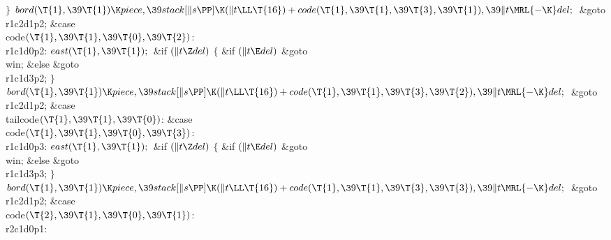 \2${}\}{}$\2\6
${}\\{bord}(\T{1},\39\T{1})\K\\{piece},\39\\{stack}[\|s\PP]\K(\|t\LL\T{16})+%
\\{code}(\T{1},\39\T{1},\39\T{3},\39\T{1}),\39\|t\MRL{-{\K}}\\{del};{}$\6
\&{goto} \\{r1c2d1p2};\6
\4\&{case} \\{code}${}(\T{1},\39\T{1},\39\T{0},\39\T{2}){}$:\5
\\{r1c1d0p2}:\5
${}\\{east}(\T{1},\39\T{1});{}$\6
\&{if} ${}(\|t\Z\\{del}){}$\5
${}\{{}$\5
\1\&{if} ${}(\|t\E\\{del}){}$\1\5
\&{goto} \\{win};\5
\2\&{else}\1\5
\&{goto} \\{r1c1d3p2};\5
\2${}\}{}$\2\6
${}\\{bord}(\T{1},\39\T{1})\K\\{piece},\39\\{stack}[\|s\PP]\K(\|t\LL\T{16})+%
\\{code}(\T{1},\39\T{1},\39\T{3},\39\T{2}),\39\|t\MRL{-{\K}}\\{del};{}$\6
\&{goto} \\{r1c2d1p2};\6
\4\&{case} \\{tailcode}${}(\T{1},\39\T{1},\39\T{0}){}$:\5
\&{case} \\{code}${}(\T{1},\39\T{1},\39\T{0},\39\T{3}){}$:\5
\\{r1c1d0p3}:\5
${}\\{east}(\T{1},\39\T{1});{}$\6
\&{if} ${}(\|t\Z\\{del}){}$\5
${}\{{}$\5
\1\&{if} ${}(\|t\E\\{del}){}$\1\5
\&{goto} \\{win};\5
\2\&{else}\1\5
\&{goto} \\{r1c1d3p3};\5
\2${}\}{}$\2\6
${}\\{bord}(\T{1},\39\T{1})\K\\{piece},\39\\{stack}[\|s\PP]\K(\|t\LL\T{16})+%
\\{code}(\T{1},\39\T{1},\39\T{3},\39\T{3}),\39\|t\MRL{-{\K}}\\{del};{}$\6
\&{goto} \\{r1c2d1p2};\6
\4\&{case} \\{code}${}(\T{2},\39\T{1},\39\T{0},\39\T{1}){}$:\5
\\{r2c1d0p1}:\5
